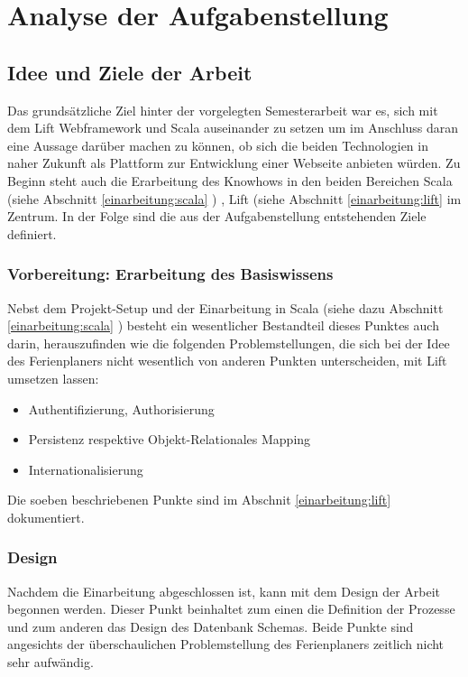 \chapter{Analyse der Aufgabenstellung}
\section{Idee und Ziele der Arbeit}
Das grunds\"atzliche Ziel hinter der vorgelegten Semesterarbeit war es, sich mit dem Lift Webframework und Scala auseinander zu setzen um im Anschluss daran eine Aussage dar\"uber machen zu können, ob sich die beiden Technologien in naher Zukunft als Plattform zur Entwicklung einer Webseite anbieten w\"urden. Zu Beginn steht auch die Erarbeitung des Knowhows in den beiden Bereichen Scala (siehe Abschnitt \ref{einarbeitung:scala} ) , Lift (siehe Abschnitt \ref{einarbeitung:lift}  im Zentrum. In der Folge sind die aus der Aufgabenstellung entstehenden Ziele definiert.

\subsection{Vorbereitung: Erarbeitung des Basiswissens}
Nebst dem Projekt-Setup und der Einarbeitung in Scala (siehe dazu Abschnitt \ref{einarbeitung:scala} )  besteht ein wesentlicher Bestandteil dieses Punktes auch darin, herauszufinden wie die folgenden Problemstellungen, die sich bei der Idee des Ferienplaners nicht wesentlich von anderen Punkten unterscheiden, mit Lift umsetzen lassen:
	\begin{itemize}
		\item Authentifizierung, Authorisierung
		\item Persistenz respektive Objekt-Relationales Mapping
		\item Internationalisierung
	\end{itemize}
Die soeben beschriebenen Punkte sind im Abschnit \ref{einarbeitung:lift}  dokumentiert.

\subsection{Design}
Nachdem die Einarbeitung abgeschlossen ist, kann mit dem Design der Arbeit begonnen werden. Dieser Punkt beinhaltet zum einen die Definition der Prozesse und zum anderen das Design des Datenbank Schemas. Beide Punkte sind angesichts der \"uberschaulichen Problemstellung des Ferienplaners zeitlich nicht sehr aufw\"andig.

